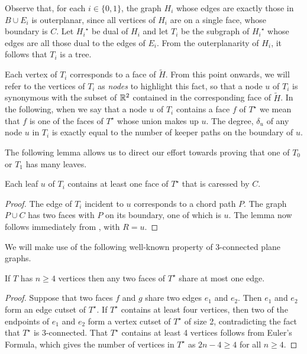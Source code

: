 \documentclass[a4paper,UKenglish]{socg-lipics-v2019}
\newcommand{\dual}[1]{{#1}^\star}
\begin{document}
Observe that, for each $i\in\{0,1\}$, the graph $H_i$ whose edges are
exactly those in $B\cup E_i$ is outerplanar, since all vertices of $H_i$
are on a single face, whose boundary is $C$.  Let $\dual{H_i}$ be dual
of $H_i$ and let $T_i$ be the subgraph of $\dual{H_i}$ whose edges are
all those dual to the edges of $E_i$. From the outerplanarity of $H_i$,
it follows that $T_i$ is a tree.  

Each vertex of $T_i$ corresponds to a face of $\tilde{H}$.  From this
point onwards, we will refer to the vertices of $T_i$ as \emph{nodes}
to highlight this fact, so that a node $u$ of $T_i$ is synonymous with
the subset of $\mathbb{R}^2$ contained in the corresponding face of $\tilde{H}$.
In the following, when we say that a node $u$ of $T_i$ contains a face $f$
of $\dual{T}$ we mean that $f$ is one of the faces of $\dual{T}$ whose
union makes up $u$.  The degree, $\delta_u$ of any node $u$ in $T_i$
is exactly equal to the number of keeper paths on the boundary of $u$.

The following lemma allows us to direct our effort towards proving that
one of $T_0$ or $T_1$ has many leaves.

\begin{lem}
   Each leaf $u$ of $T_i$ contains at least one face of $\dual{T}$
   that is caressed by $C$.
\end{lem}

\begin{proof}
   The edge of $T_i$ incident to $u$ corresponds to a chord path $P$. The
   graph $P\cup C$ has two faces with $P$ on its boundary, one of which
   is $u$.  The lemma now follows immediately from ,
   with $R=u$.
\end{proof}

We will make use of the following well-known property of
3-connected plane graphs.

\begin{lem}
   If $T$ has $n\ge 4$ vertices then any two faces of $\dual{T}$ share at 
   most one edge.
\end{lem}

\begin{proof}
   Suppose that two faces $f$ and $g$ share two edges $e_1$ and
   $e_2$. Then $e_1$ and $e_2$ form an edge cutset of $\dual{T}$.
   If $\dual{T}$ contains at least four vertices, then two of the
   endpoints of $e_1$ and $e_2$ form a vertex cutset of $\dual{T}$
   of size 2, contradicting the fact that $\dual{T}$ is 3-connected.
   That $\dual{T}$ contains at least 4 vertices follows from Euler's
   Formula, which gives the number of vertices in $\dual{T}$ as $2n-4\ge
   4$ for all $n\ge 4$.
\end{proof}
\end{document}
